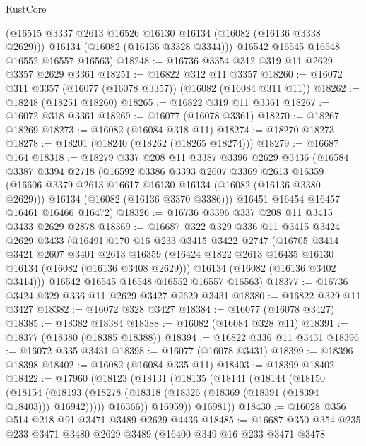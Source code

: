 \begin{lexlean}{RustCore}
\begin{coremodule}
        (@16515 @3337 @2613 @16526 @16130 @16134 (@16082 (@16136 @3338 @2629)))
        @16134
        (@16082 (@16136 @3328 @3344)))
      @16542
      @16545
      @16548
      @16552
      @16557
      @16563)
@18248 := @16736 @3354 @312 @319 @11 @2629 @3357 @2629 @3361
@18251 := @16822 @312 @11 @3357
@18260 := @16072 @311 @3357 (@16077 (@16078 @3357)) (@16082 (@16084 @311 @11))
@18262 := @18248 (@18251 @18260)
@18265 := @16822 @319 @11 @3361
@18267 := @16072 @318 @3361
@18269 := @16077 (@16078 @3361)
@18270 := @18267 @18269
@18273 := @16082 (@16084 @318 @11)
@18274 := @18270 @18273
@18278 := @18201 (@18240 (@18262 (@18265 @18274)))
@18279 := @16687 @164
@18318 := @18279
    @337
    @208
    @11
    @3387
    @3396
    @2629
    @3436
    (@16584
      @3387
      @3394
      @2718
      (@16592
        @3386
        @3393
        @2607
        @3369
        @2613
        @16359
        (@16606 @3379 @2613 @16617 @16130 @16134 (@16082 (@16136 @3380 @2629)))
        @16134
        (@16082 (@16136 @3370 @3386)))
      @16451
      @16454
      @16457
      @16461
      @16466
      @16472)
@18326 := @16736 @3396 @337 @208 @11 @3415 @3433 @2629 @2878
@18369 := @16687
    @322
    @329
    @336
    @11
    @3415
    @3424
    @2629
    @3433
    (@16491
      @170
      @16
      @233
      @3415
      @3422
      @2747
      (@16705
        @3414
        @3421
        @2607
        @3401
        @2613
        @16359
        (@16424 @1822 @2613 @16435 @16130 @16134 (@16082 (@16136 @3408 @2629)))
        @16134
        (@16082 (@16136 @3402 @3414)))
      @16542
      @16545
      @16548
      @16552
      @16557
      @16563)
@18377 := @16736 @3424 @329 @336 @11 @2629 @3427 @2629 @3431
@18380 := @16822 @329 @11 @3427
@18382 := @16072 @328 @3427
@18384 := @16077 (@16078 @3427)
@18385 := @18382 @18384
@18388 := @16082 (@16084 @328 @11)
@18391 := @18377 (@18380 (@18385 @18388))
@18394 := @16822 @336 @11 @3431
@18396 := @16072 @335 @3431
@18398 := @16077 (@16078 @3431)
@18399 := @18396 @18398
@18402 := @16082 (@16084 @335 @11)
@18403 := @18399 @18402
@18422 := @17960
    (@18123
      (@18131
        (@18135
          (@18141
            (@18144
              (@18150
                (@18154
                  (@18193 (@18278 (@18318 (@18326 (@18369 (@18391 (@18394 @18403))) @16942)))))
                @16366))
            @16959))
        @16981))
@18430 := @16028 @356 @514 @218 @91 @3471 @3489 @2629 @4436
@18485 := @16687
    @350
    @354
    @235
    @233
    @3471
    @3480
    @2629
    @3489
    (@16400
      @349
      @16
      @233
      @3471
      @3478

\end{coremodule}
\end{lexlean}
